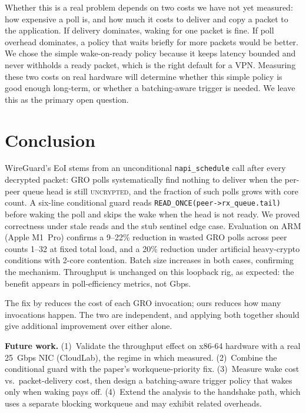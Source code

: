 \documentclass{article}
\begin{document}
Whether this is a real problem depends on two costs we have not yet measured:
how expensive a poll is, and how much it costs to deliver and copy a packet to
the application. If delivery dominates, waking for one packet is fine. If poll
overhead dominates, a policy that waits briefly for more packets would be
better. We chose the simple wake-on-ready policy because it keeps latency
bounded and never withholds a ready packet, which is the right default for a
VPN. Measuring these two costs on real hardware will determine whether this
simple policy is good enough long-term, or whether a batching-aware trigger is
needed. We leave this as the primary open question.

\section{Conclusion}
\label{sec:conclusion}

WireGuard's EoI stems from an unconditional \texttt{napi\_schedule} call after
every decrypted packet: GRO polls systematically find nothing to deliver when
the per-peer queue head is still \textsc{uncrypted}, and the fraction of such
polls grows with core count. A six-line conditional guard reads
\texttt{READ\_ONCE(peer->rx\_queue.tail)} before waking the poll and skips the
wake when the head is not ready. We proved correctness under stale reads and
the stub sentinel edge case. Evaluation on ARM (Apple M1~Pro) confirms a
9--22\% reduction in wasted GRO polls across peer counts 1--32 at fixed total
load, and a 20\% reduction under artificial heavy-crypto conditions with 2-core
contention. Batch size increases in both cases, confirming the mechanism.
Throughput is unchanged on this loopback rig, as expected: the benefit appears
in poll-efficiency metrics, not Gbps.

The fix by \citeauthor{mounah2025} reduces the cost of each GRO invocation;
ours reduces how many invocations happen. The two are independent, and applying
both together should give additional improvement over either alone.

\smallskip\noindent\textbf{Future work.}
(1)~Validate the throughput effect on x86-64 hardware with a real 25~Gbps NIC
(CloudLab), the regime in which \citeauthor{mounah2025} measured.
(2)~Combine the conditional guard with the paper's workqueue-priority fix.
(3)~Measure wake cost vs.\ packet-delivery cost, then design a batching-aware
trigger policy that wakes only when waking pays off.
(4)~Extend the analysis to the handshake path, which uses a separate blocking
workqueue and may exhibit related overheads.



\end{document}
